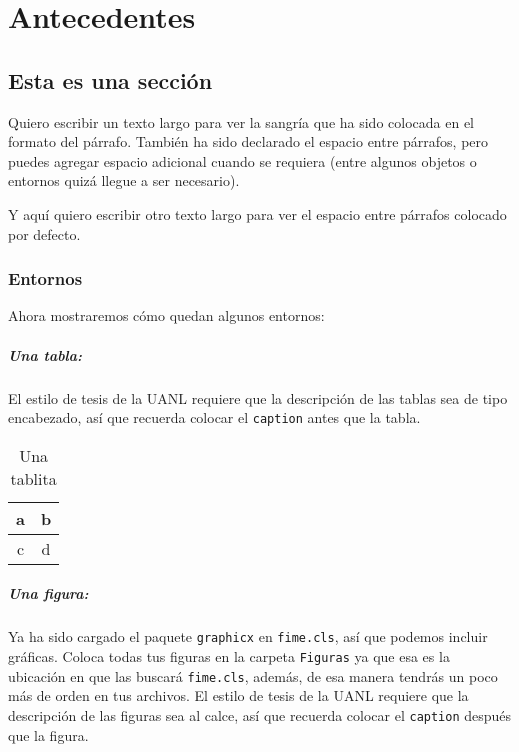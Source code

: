 \chapter{Antecedentes}

\section{Esta es una sección}

Quiero escribir un texto largo para ver la sangría que ha sido colocada en el formato del párrafo. También ha sido declarado el espacio entre párrafos, pero puedes agregar espacio adicional cuando se requiera (entre algunos objetos o entornos quizá llegue a ser necesario).

Y aquí quiero escribir otro texto largo para ver el espacio entre párrafos colocado por defecto.

\subsection{Entornos}

Ahora mostraremos cómo quedan algunos entornos:

\paragraph{Una tabla:} El estilo de tesis de la UANL requiere que la descripción de las tablas sea de tipo encabezado, así que recuerda colocar el {\tt caption} antes que la tabla.

\begin{table}[ht]
	\centering
	\caption{Una tablita}
	\label{tab:una-tablita}
		\begin{tabular}{|c|c|}
			\hline
			a & b \\
			\hline
			c & d \\
			\hline
		\end{tabular}
\end{table}

\paragraph{Una figura:} Ya ha sido cargado el paquete {\tt graphicx} en {\tt fime.cls}, así que podemos incluir gráficas. Coloca todas tus figuras en la carpeta {\tt Figuras} ya que esa es la ubicación en que las buscará {\tt fime.cls}, además, de esa manera tendrás un poco más de orden en tus archivos. El estilo de tesis de la UANL requiere que la descripción de las figuras sea al calce, así que recuerda colocar el {\tt caption} después que la figura.

